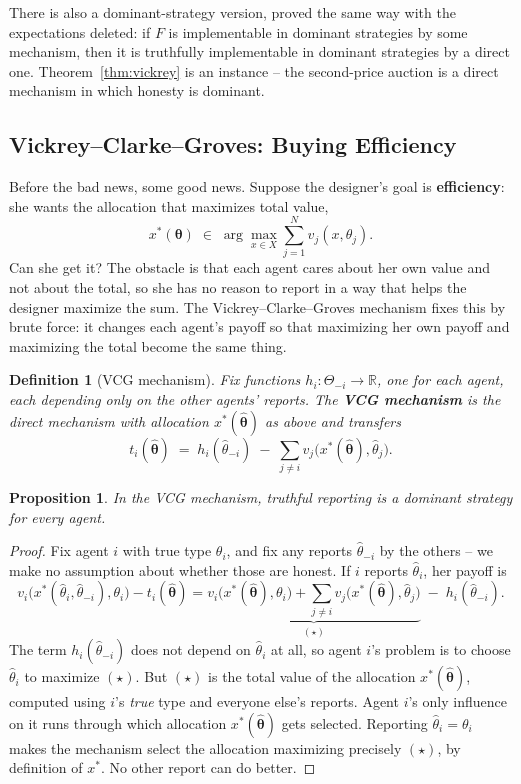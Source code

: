 \documentclass[12pt]{article}
\newcommand{\bbR}{\mathbb{R}}
\newtheorem{definition}[theorem]{Definition}
\newtheorem{proposition}[theorem]{Proposition}
\theoremstyle{definition}
\theoremstyle{remark}
\theoremstyle{plain}                          %
\newcommand{\Th}{\Theta}
\newcommand{\tv}{\boldsymbol{\theta}}
\begin{document}
There is also a dominant-strategy version, proved the same way with the expectations deleted: if $F$ is implementable in dominant strategies by some mechanism, then it is truthfully implementable in dominant strategies by a direct one. Theorem~\ref{thm:vickrey} is an instance -- the second-price auction is a direct mechanism in which honesty is dominant.
 
\subsection{Vickrey--Clarke--Groves: Buying Efficiency}\label{sec:vcg}
 
Before the bad news, some good news. Suppose the designer's goal is \textbf{efficiency}: she wants the allocation that maximizes total value,
\[
    x^*(\tv) \;\in\; \arg\max_{x \in X} \sum_{j=1}^N v_j(x,\theta_j).
\]
Can she get it? The obstacle is that each agent cares about her own value and not about the total, so she has no reason to report in a way that helps the designer maximize the sum. The Vickrey--Clarke--Groves mechanism fixes this by brute force: it changes each agent's payoff so that maximizing her own payoff and maximizing the total become the same thing.
 
\begin{definition}[VCG mechanism]
Fix functions $h_i : \Th_{-i} \to \bbR$, one for each agent, each depending only on the \emph{other} agents' reports. The \textbf{VCG mechanism} is the direct mechanism with allocation $x^*(\hat{\tv})$ as above and transfers
\[
    t_i(\hat{\tv}) \;=\; h_i(\hat\theta_{-i}) \;-\; \sum_{j \neq i} v_j\big(x^*(\hat{\tv}),\hat\theta_j\big).
\]
\end{definition}
 
\begin{proposition}\label{prop:vcg}
In the VCG mechanism, truthful reporting is a dominant strategy for every agent.
\end{proposition}
 
\begin{proof}
Fix agent $i$ with true type $\theta_i$, and fix any reports $\hat\theta_{-i}$ by the others -- we make no assumption about whether those are honest. If $i$ reports $\hat\theta_i$, her payoff is
\[
    v_i\big(x^*(\hat\theta_i,\hat\theta_{-i}),\theta_i\big) - t_i(\hat{\tv})
    = \underbrace{v_i\big(x^*(\hat{\tv}),\theta_i\big) + \sum_{j\neq i} v_j\big(x^*(\hat{\tv}),\hat\theta_j\big)}_{(\star)}
      \;-\; h_i(\hat\theta_{-i}).
\]
The term $h_i(\hat\theta_{-i})$ does not depend on $\hat\theta_i$ at all, so agent $i$'s problem is to choose $\hat\theta_i$ to maximize $(\star)$. But $(\star)$ is the total value of the allocation $x^*(\hat{\tv})$, computed using $i$'s \emph{true} type and everyone else's reports. Agent $i$'s only influence on it runs through which allocation $x^*(\hat{\tv})$ gets selected. Reporting $\hat\theta_i = \theta_i$ makes the mechanism select the allocation maximizing precisely $(\star)$, by definition of $x^*$. No other report can do better.
\end{proof}
 
\end{document}
